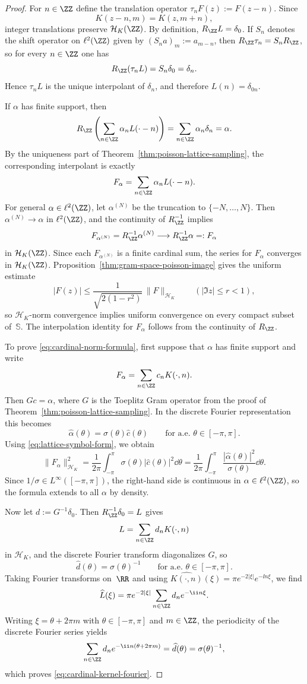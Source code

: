 \begin{proof}
For $n\in\ZZ$ define the translation operator
$\tau_nF(z):=F(z-n)$.  Since
\[
K(z-n,m)=K(z,m+n),
\]
integer translations preserve $\mathcal H_K(\ZZ)$.  By definition,
$R_{\ZZ}L=\delta_0$.  If $S_n$ denotes the shift operator on
$\ell^2(\ZZ)$ given by $(S_na)_m:=a_{m-n}$, then
$R_{\ZZ}\tau_n=S_nR_{\ZZ}$, so for every $n\in\ZZ$
one has
\[
R_{\ZZ}(\tau_nL)=S_n\delta_0=\delta_n.
\]
Hence $\tau_nL$ is the unique interpolant of $\delta_n$, and therefore
$L(n)=\delta_{0n}$.

If $\alpha$ has finite support, then
\[
R_{\ZZ}\left(\sum_{n\in\ZZ}\alpha_nL(\cdot-n)\right)
=\sum_{n\in\ZZ}\alpha_n\delta_n
=\alpha.
\]
By the uniqueness part of
Theorem~\ref{thm:poisson-lattice-sampling}, the corresponding interpolant
is exactly
\[
F_\alpha=\sum_{n\in\ZZ}\alpha_nL(\cdot-n).
\]
For general $\alpha\in\ell^2(\ZZ)$, let $\alpha^{(N)}$ be the truncation
to $\{-N,\dots,N\}$.  Then $\alpha^{(N)}\to\alpha$ in $\ell^2(\ZZ)$, and
the continuity of $R_{\ZZ}^{-1}$ implies
\[
F_{\alpha^{(N)}}=R_{\ZZ}^{-1}\alpha^{(N)}
\longrightarrow
R_{\ZZ}^{-1}\alpha=:F_\alpha
\]
in $\mathcal H_K(\ZZ)$.  Since each $F_{\alpha^{(N)}}$ is a finite
cardinal sum, the series for $F_\alpha$ converges in $\mathcal H_K(\ZZ)$.
Proposition~\ref{thm:gram-space-poisson-image} gives the uniform estimate
\[
|F(z)|\le \frac{1}{\sqrt{2(1-r^2)}}\,\|F\|_{\mathcal H_K}
\qquad(|\Im z|\le r<1),
\]
so $\mathcal H_K$-norm convergence implies uniform convergence on every
compact subset of~$\mathbb S$.  The interpolation identity for $F_\alpha$
follows from the continuity of $R_{\ZZ}$.

To prove \eqref{eq:cardinal-norm-formula}, first suppose that $\alpha$
has finite support and write
\[
F_\alpha=\sum_{n\in\ZZ}c_nK(\cdot,n).
\]
Then $Gc=\alpha$, where $G$ is the Toeplitz Gram operator from the proof
of Theorem~\ref{thm:poisson-lattice-sampling}.  In the discrete Fourier
representation this becomes
\[
\widehat\alpha(\theta)=\sigma(\theta)\widehat c(\theta)
\qquad\text{for a.e. }\theta\in[-\pi,\pi].
\]
Using \eqref{eq:lattice-symbol-form}, we obtain
\[
\|F_\alpha\|_{\mathcal H_K}^2
=\frac{1}{2\pi}\int_{-\pi}^{\pi}
\sigma(\theta)|\widehat c(\theta)|^2\dd\theta
=\frac{1}{2\pi}\int_{-\pi}^{\pi}
\frac{|\widehat\alpha(\theta)|^2}{\sigma(\theta)}\dd\theta.
\]
Since $1/\sigma\in L^\infty([-\pi,\pi])$, the right-hand side is
continuous in $\alpha\in\ell^2(\ZZ)$, so the formula extends to all
$\alpha$ by density.

Now let $d:=G^{-1}\delta_0$.  Then $R_{\ZZ}^{-1}\delta_0=L$ gives
\[
L=\sum_{n\in\ZZ}d_nK(\cdot,n)
\]
in $\mathcal H_K$, and the discrete Fourier transform diagonalizes $G$,
so
\[
\widehat d(\theta)=\sigma(\theta)^{-1}
\qquad\text{for a.e. }\theta\in[-\pi,\pi].
\]
Taking Fourier transforms on~$\RR$ and using
$\widehat{K(\cdot,n)}(\xi)=\pi e^{-2|\xi|}e^{-\ii n\xi}$, we find
\[
\widehat L(\xi)
=\pi e^{-2|\xi|}\sum_{n\in\ZZ}d_ne^{-\ii n\xi}.
\]
Writing $\xi=\theta+2\pi m$ with $\theta\in[-\pi,\pi]$ and $m\in\ZZ$,
the periodicity of the discrete Fourier series yields
\[
\sum_{n\in\ZZ}d_ne^{-\ii n(\theta+2\pi m)}
=\widehat d(\theta)
=\sigma(\theta)^{-1},
\]
which proves \eqref{eq:cardinal-kernel-fourier}.
\end{proof}

